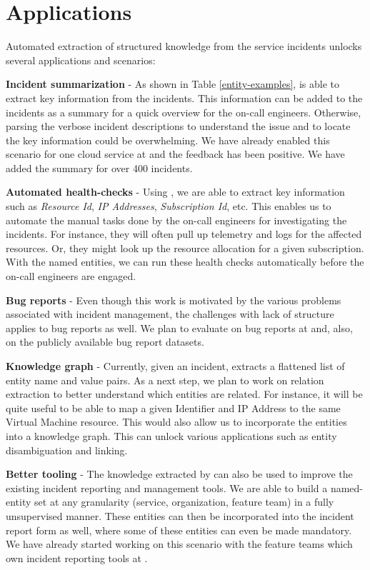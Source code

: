 \section{Applications}
Automated extraction of structured knowledge from the service incidents unlocks several applications and scenarios:

\textbf{Incident summarization} - As shown in Table \ref{entity-examples}, \softner{} is able to extract key information from the incidents. This information can be added to the incidents as a summary for a quick overview for the on-call engineers. Otherwise, parsing the verbose incident descriptions to understand the issue and to locate the key information could be overwhelming. We have already enabled this scenario for one cloud service at \CompanyX{} and the feedback has been positive. We have added the summary for over 400 incidents.

\textbf{Automated health-checks} - Using \softner{}, we are able to extract key information such as \textit{Resource Id}, \textit{IP Addresses}, \textit{Subscription Id}, etc. This enables us to automate the manual tasks done by the on-call engineers for investigating the incidents. For instance, they will often pull up telemetry and logs for the affected resources. Or, they might look up the resource allocation for a given subscription. With the named entities, we can run these health checks automatically before the on-call engineers are engaged.

\textbf{Bug reports} - Even though this work is motivated by the various problems associated with incident management, the challenges with lack of structure applies to bug reports as well. We plan to evaluate \softner{} on bug reports at \CompanyX{} and, also, on the publicly available bug report datasets.

\textbf{Knowledge graph} - Currently, given an incident, \softner{} extracts a flattened list of entity name and value pairs. As a next step, we plan to work on relation extraction to better understand which entities are related. For instance, it will be quite useful to be able to map a given Identifier and IP Address to the same Virtual Machine resource. This would also allow us to incorporate the entities into a knowledge graph. This can unlock various applications such as entity disambiguation and linking.

\textbf{Better tooling} - The knowledge extracted by \softner{} can also be used to improve the existing incident reporting and management tools. We are able to build a named-entity set at any granularity (service, organization, feature team) in a fully unsupervised manner. These entities can then be incorporated into the incident report form as well, where some of these entities can even be made mandatory. We have already started working on this scenario with the feature teams which own incident reporting tools at \CompanyX{}.

